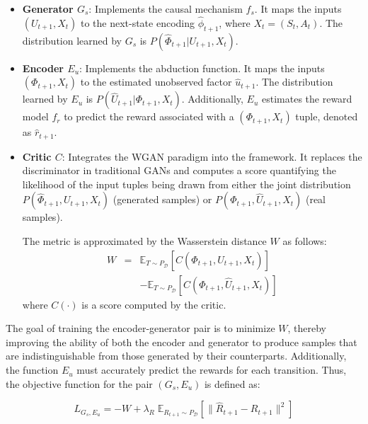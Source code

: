 \begin{itemize}
    \item \textbf{Generator \( G_s \)}:
    Implements the causal mechanism \( f_s \).
    It maps the inputs \( (U_{t+1}, X_t) \)
    to the next-state encoding \( \hat{\phi}_{t+1} \),
    where \( X_t = (S_t, A_t) \).
    The distribution learned by \( G_s \) is
    \( P(\hat{\Phi}_{t+1} | U_{t+1}, X_t) \).
    \item \textbf{Encoder \( E_u \)}: Implements the abduction function.
    It maps the inputs \( (\Phi_{t+1}, X_t) \) to the
    estimated unobserved factor \( \hat{u}_{t+1} \).
    The distribution learned by \( E_u \) is
    \( P(\hat{U}_{t+1} | \Phi_{t+1}, X_t) \).
    Additionally, \( E_u \) estimates the reward model \( f_r \)
    to predict the reward associated with a \( (\Phi_{t+1}, X_t) \)
    tuple, denoted as \( \hat{r}_{t+1} \).
    \item \textbf{Critic \( C \)}: Integrates the WGAN paradigm
    into the framework. It replaces the discriminator in
    traditional GANs and computes a score quantifying
    the likelihood of the input tuples being drawn
    from either the joint distribution
    \( P(\hat{\Phi}_{t+1}, U_{t+1}, X_t) \) (generated samples) or
    \( P(\Phi_{t+1}, \hat{U}_{t+1}, X_t) \) (real samples).
    
    The metric is approximated by the Wasserstein distance \( W \)
    as follows:
    \begin{equation}
        \begin{aligned}
            W &=& \mathbb{E}_{T \sim P_{\mathcal{D}}} \left[ C(\hat{\Phi}_{t+1}, U_{t+1}, X_t) \right] \\ 
            & &- \mathbb{E}_{T \sim P_{\mathcal{D}}} \left[ C(\Phi_{t+1}, \hat{U}_{t+1}, X_t) \right]
        \end{aligned}
    \end{equation}
    where $C(\cdot)$ is a score computed by the critic.
\end{itemize}

The goal of training the encoder-generator pair is to minimize \( W \),
thereby improving the ability of both the encoder and generator
to produce samples that are indistinguishable from those generated
by their counterparts. Additionally, the function \( E_u \) must
accurately predict the rewards for each transition.
Thus, the objective function for the pair \( (G_s, E_u) \) is defined as:

\begin{equation}
L_{G_s, E_u} = -W + \lambda_R \; \mathbb{E}_{R_{t+1} \sim P_{\mathcal{D}}}
\left[ \| \hat{R}_{t+1} - R_{t+1} \|^2 \right]
\end{equation}

